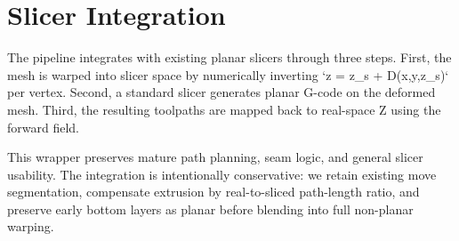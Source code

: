 \section{Slicer Integration}

The pipeline integrates with existing planar slicers through three steps. First, the mesh is warped into slicer space by numerically inverting `z = z_s + D(x,y,z_s)` per vertex. Second, a standard slicer generates planar G-code on the deformed mesh. Third, the resulting toolpaths are mapped back to real-space Z using the forward field.

This wrapper preserves mature path planning, seam logic, and general slicer usability. The integration is intentionally conservative: we retain existing move segmentation, compensate extrusion by real-to-sliced path-length ratio, and preserve early bottom layers as planar before blending into full non-planar warping.
